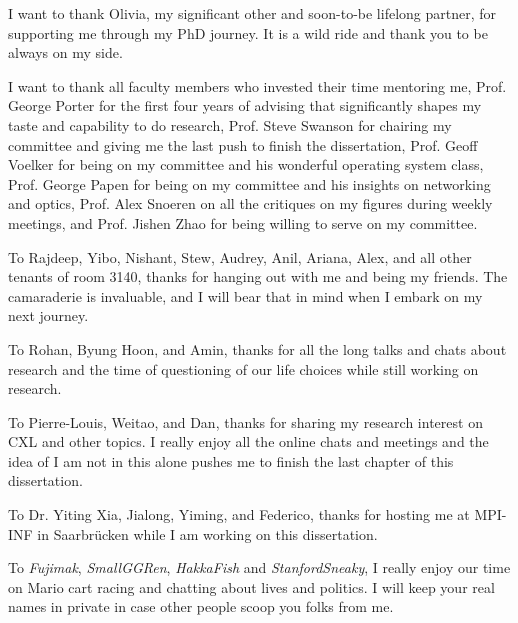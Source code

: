 \begin{frontmatter}
%
\tableofcontents
\listoffigures  %
\listoftables   %



%
%
\begin{acknowledgements}
%
I want to thank Olivia, my significant other and soon-to-be lifelong partner, for supporting me through my PhD journey.
%
It is a wild ride and thank you to be always on my side.

I want to thank all faculty members who invested their time mentoring me, 
%
Prof. George Porter for the first four years of advising that significantly shapes my taste and capability to do research, 
%
Prof. Steve Swanson for chairing my committee and giving me the last push to finish the dissertation,
%
Prof. Geoff Voelker for being on my committee and his wonderful operating system class,
%
Prof. George Papen for being on my committee and his insights on networking and optics, 
%
Prof. Alex Snoeren on all the critiques on my figures during weekly meetings, 
%
and Prof. Jishen Zhao for being willing to serve on my committee.

To Rajdeep, Yibo, Nishant, Stew, Audrey, Anil, Ariana, Alex, and all other tenants of room 3140, thanks for hanging out with me and being my friends.
%
The camaraderie is invaluable, and I will bear that in mind when I embark on my next journey.

To Rohan, Byung Hoon, and Amin, thanks for all the long talks and chats about research and the time of questioning of our life choices while still working on research. 

To Pierre-Louis, Weitao, and Dan, thanks for sharing my research interest on CXL and other topics.
%
I really enjoy all the online chats and meetings and the idea of I am not in this alone pushes me to finish the last chapter of this dissertation.

To Dr. Yiting Xia, Jialong, Yiming, and Federico, thanks for hosting me at MPI-INF in Saarbr\"{u}cken while I am working on this dissertation. 

To \textit{Fujimak}, \textit{SmallGGRen}, \textit{HakkaFish} and \textit{StanfordSneaky}, I really enjoy our time on Mario cart racing and chatting about lives and politics. I will keep your real names in private in case other people scoop you folks from me. 


\end{acknowledgements}
\end{frontmatter}
